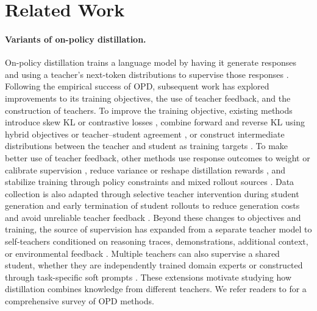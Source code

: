 \documentclass[11pt]{article}
\begin{document}
\section{Related Work}
\label{sec:related-work}

\paragraph{Variants of on-policy distillation.}
On-policy distillation trains a language model by having it generate responses and using a teacher's next-token distributions to supervise those responses \citep{agarwal2024policy,gu2024minillm}. Following the empirical success of OPD, subsequent work has explored improvements to its training objectives, the use of teacher feedback, and the construction of teachers. To improve the training objective, existing methods introduce skew KL or contrastive losses \citep{ko2024distillm,ko2025distillm}, combine forward and reverse KL using hybrid objectives or teacher--student agreement \citep{zhu2026hybrid,jin2026entropy,xing2026trust}, or construct intermediate distributions between the teacher and student as training targets \citep{jang2026stable,xie2026trust}. To make better use of teacher feedback, other methods use response outcomes to weight or calibrate supervision \citep{zheng2026scope,hou2026uni}, reduce variance or reshape distillation rewards \citep{oh2026kl,zhao2026poweropd}, and stabilize training through policy constraints and mixed rollout sources \citep{luo2026demystifying}. Data collection is also adapted through selective teacher intervention during student generation \citep{xu2025speculative} and early termination of student rollouts to reduce generation costs and avoid unreliable teacher feedback \citep{ziheng2026less,xin2026escaping,zhang2026fast}. Beyond these changes to objectives and training, the source of supervision has expanded from a separate teacher model to self-teachers conditioned on reasoning traces, demonstrations, additional context, or environmental feedback \citep{zhao2026self,shenfeld2026self,ye2026policy,hubotter2026reinforcement,liu2026self}. Multiple teachers can also supervise a shared student, whether they are independently trained domain experts \citep{ma2026mopd} or constructed through task-specific soft prompts \citep{ma2026one}. These extensions motivate studying how distillation combines knowledge from different teachers. We refer readers to \citet{song2026survey} for a comprehensive survey of OPD methods.
\end{document}
